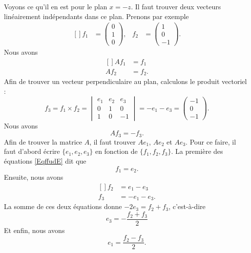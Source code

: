 Voyons ce qu'il en est pour le plan \( x=-z\). Il faut trouver deux vecteurs linéairement indépendants dans ce plan. Prenons par exemple
\begin{equation}		\label{EqffudE}
	\begin{aligned}[]
		f_1 & =\begin{pmatrix}
			       0 \\
			       1 \\
			       0
		       \end{pmatrix}, & f_2 & =\begin{pmatrix}
			                               1 \\
			                               0 \\
			                               -1
		                               \end{pmatrix}.
	\end{aligned}
\end{equation}
Nous avons
\begin{equation}
	\begin{aligned}[]
		Af_1 & =f_1  \\
		Af_2 & =f_2.
	\end{aligned}
\end{equation}
Afin de trouver un vecteur perpendiculaire au plan, calculons le produit vectoriel :
\begin{equation}
	f_3=f_1\times f_2=\begin{vmatrix}
		e_1 & e_2 & e_3 \\
		0   & 1   & 0   \\
		1   & 0   & -1
	\end{vmatrix}=-e_1-e_3=\begin{pmatrix}
		-1 \\
		0  \\
		-1
	\end{pmatrix}.
\end{equation}
Nous avons
\begin{equation}
	Af_3=-f_3.
\end{equation}
Afin de trouver la matrice \( A\), il faut trouver \( Ae_1\), \( Ae_2\) et \( Ae_3\). Pour ce faire, il faut d'abord écrire \( \{ e_1,e_2,e_3 \}\) en fonction de \( \{ f_1,f_2,f_3 \}\). La première des équations \eqref{EqffudE} dit que
\begin{equation}
	f_1=e_2.
\end{equation}
Ensuite, nous avons
\begin{equation}
	\begin{aligned}[]
		f_2 & =e_1-e_3   \\
		f_3 & =-e_1-e_3.
	\end{aligned}
\end{equation}
La somme de ces deux équations donne \( -2e_3=f_2+f_3\), c'est-à-dire
\begin{equation}
	e_3=-\frac{ f_2+f_3 }{ 2 }
\end{equation}
Et enfin, nous avons
\begin{equation}
	e_1=\frac{ f_2-f_3 }{ 2 }.
\end{equation}

